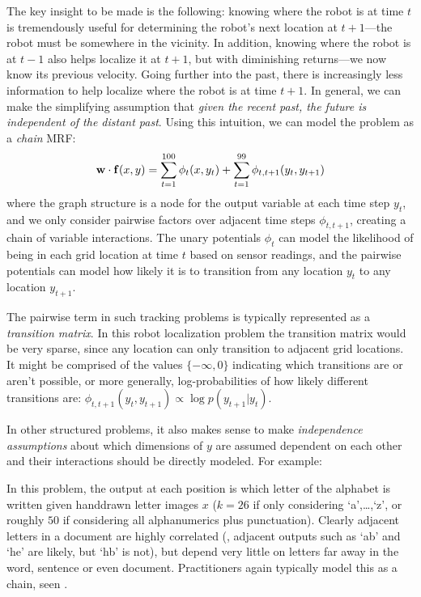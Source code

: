 The key insight to be made is the following: knowing where the robot is at time 
$t$ is tremendously useful for determining the robot's next location at 
$t+1$---the robot must be somewhere in the vicinity.  In addition, knowing 
where the robot is at $t-1$ also helps localize it at $t+1$, but with 
diminishing returns---we now know its previous velocity.  Going further into 
the past, there is increasingly less information to help localize where the 
robot is at time $t+1$.
In general, we can make the simplifying assumption that {\em given the recent 
past, the future is independent of the distant past}.  Using this intuition, we 
can model the problem as a {\em chain} MRF:
\begin{equation}
\mathbf{w} \cdot \mathbf{f}(x,y) = \sum_{t=1}^{100} \phi_t(x,y_t) + \sum_{t=1}^{99} 
\phi_{t,t+1}(y_t,y_{t+1})
\end{equation}
where the graph structure is a node for the output variable at each time step 
$y_t$, and we only consider pairwise factors over adjacent time steps 
$\phi_{t,t+1}$, creating a chain of variable interactions.  The unary 
potentials $\phi_t$ can model the likelihood of being in each grid location at 
time $t$ based on sensor readings, and the pairwise potentials can model how 
likely it is to transition from any location $y_t$ to any location $y_{t+1}$.  

The pairwise term in such tracking problems is typically represented as a {\em 
transition matrix}.  In this robot localization problem the transition matrix 
would be very sparse, since any location can only transition to adjacent grid 
locations.  It might be comprised of the values $\{-\infty,0\}$ indicating 
which transitions are or aren't possible, or more generally, log-probabilities 
of how likely different transitions are: $\phi_{t,t+1}(y_t,y_{t+1}) \propto 
\log p(y_{t+1} | y_t)$.


In other structured problems, it also makes sense to make {\em independence 
assumptions} about which dimensions of $y$ are assumed dependent on each other 
and their interactions should be directly modeled. For example: 

 In this problem, the output at each position is 
which letter of the alphabet is written given handdrawn letter images $x$ 
($k=26$ if only considering `a',\ldots,`z', or roughly $50$ if considering all 
alphanumerics plus punctuation).  Clearly adjacent letters in a document are 
highly correlated (\eg, adjacent outputs such as `ab' and `he' are likely, but 
`hb' is not), but depend very little on letters far away in the word, sentence 
or even document.  Practitioners again typically model this as a chain, seen 
.

